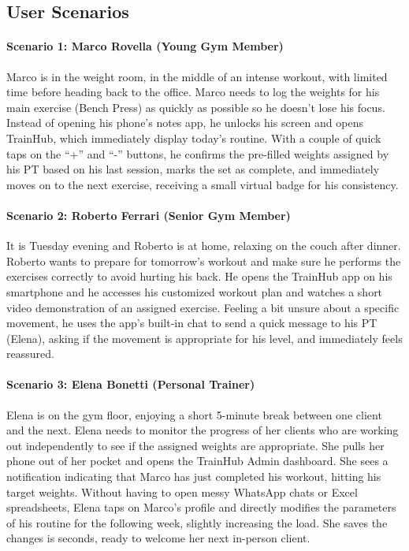 \subsection{User Scenarios}\label{subsect:Scenarios}

\paragraph{Scenario 1: Marco Rovella (Young Gym Member)}Marco is in the weight room, in the middle of an intense workout, with limited time before heading back to the office. Marco needs to log the weights for his main exercise (Bench Press) as quickly as possible so he doesn't lose his focus.
Instead of opening his phone's notes app, he unlocks his screen and opens TrainHub, which immediately display today's routine. With a couple of quick taps on the “+” and “-” buttons, he confirms the pre-filled weights assigned by his PT based on his last session, marks the set as complete, and immediately moves on to the next exercise, receiving a small virtual badge for his consistency.

\paragraph{Scenario 2: Roberto Ferrari (Senior Gym Member)}It is Tuesday evening and Roberto is at home, relaxing on the couch after dinner. Roberto wants to prepare for tomorrow's workout and make sure he performs the exercises correctly to avoid hurting his back.
He opens the TrainHub app on his smartphone and he accesses his customized workout plan and watches a short video demonstration of an assigned exercise. Feeling a bit unsure about a specific movement, he uses the app's built-in chat to send a quick message to his PT (Elena), asking if the movement is appropriate for his level, and immediately feels reassured.

\paragraph{Scenario 3: Elena Bonetti (Personal Trainer)}Elena is on the gym floor, enjoying a short 5-minute break between one client and the next. Elena needs to monitor the progress of her clients who are working out independently to see if the assigned weights are appropriate. She pulls her phone out of her pocket and opens the TrainHub Admin dashboard. She sees a notification indicating that Marco has just completed his workout, hitting his target weights. Without having to open messy WhatsApp chats or Excel spreadsheets, Elena taps on Marco's profile and directly modifies the parameters of his routine for the following week, slightly increasing the load. She saves the changes is seconds, ready to welcome her next in-person client.

